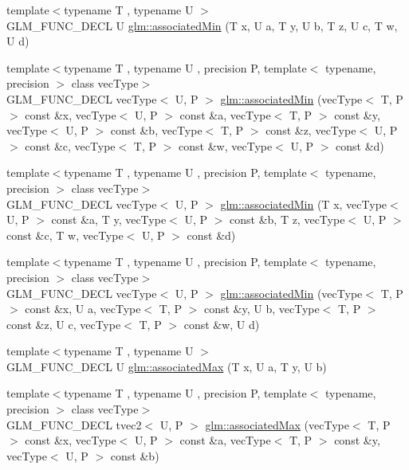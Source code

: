 \begin{DoxyCompactItemize}
\item 
{\footnotesize template$<$typename T , typename U $>$ }\\G\-L\-M\-\_\-\-F\-U\-N\-C\-\_\-\-D\-E\-C\-L U \hyperlink{group__gtx__associated__min__max_ga432224ebe2085eaa2b63a077ecbbbff6}{glm\-::associated\-Min} (T x, U a, T y, U b, T z, U c, T w, U d)
\item 
{\footnotesize template$<$typename T , typename U , precision P, template$<$ typename, precision $>$ class vec\-Type$>$ }\\G\-L\-M\-\_\-\-F\-U\-N\-C\-\_\-\-D\-E\-C\-L vec\-Type$<$ U, P $>$ \hyperlink{group__gtx__associated__min__max_ga88e031f22b80215505928900d3dde549}{glm\-::associated\-Min} (vec\-Type$<$ T, P $>$ const \&x, vec\-Type$<$ U, P $>$ const \&a, vec\-Type$<$ T, P $>$ const \&y, vec\-Type$<$ U, P $>$ const \&b, vec\-Type$<$ T, P $>$ const \&z, vec\-Type$<$ U, P $>$ const \&c, vec\-Type$<$ T, P $>$ const \&w, vec\-Type$<$ U, P $>$ const \&d)
\item 
{\footnotesize template$<$typename T , typename U , precision P, template$<$ typename, precision $>$ class vec\-Type$>$ }\\G\-L\-M\-\_\-\-F\-U\-N\-C\-\_\-\-D\-E\-C\-L vec\-Type$<$ U, P $>$ \hyperlink{group__gtx__associated__min__max_ga0f63b0dce5a5c3242cc6d9847e7d14f1}{glm\-::associated\-Min} (T x, vec\-Type$<$ U, P $>$ const \&a, T y, vec\-Type$<$ U, P $>$ const \&b, T z, vec\-Type$<$ U, P $>$ const \&c, T w, vec\-Type$<$ U, P $>$ const \&d)
\item 
{\footnotesize template$<$typename T , typename U , precision P, template$<$ typename, precision $>$ class vec\-Type$>$ }\\G\-L\-M\-\_\-\-F\-U\-N\-C\-\_\-\-D\-E\-C\-L vec\-Type$<$ U, P $>$ \hyperlink{group__gtx__associated__min__max_ga00a949fd345f4b31b259f033d3ab4a1c}{glm\-::associated\-Min} (vec\-Type$<$ T, P $>$ const \&x, U a, vec\-Type$<$ T, P $>$ const \&y, U b, vec\-Type$<$ T, P $>$ const \&z, U c, vec\-Type$<$ T, P $>$ const \&w, U d)
\item 
{\footnotesize template$<$typename T , typename U $>$ }\\G\-L\-M\-\_\-\-F\-U\-N\-C\-\_\-\-D\-E\-C\-L U \hyperlink{group__gtx__associated__min__max_ga7d9c8785230c8db60f72ec8975f1ba45}{glm\-::associated\-Max} (T x, U a, T y, U b)
\item 
{\footnotesize template$<$typename T , typename U , precision P, template$<$ typename, precision $>$ class vec\-Type$>$ }\\G\-L\-M\-\_\-\-F\-U\-N\-C\-\_\-\-D\-E\-C\-L tvec2$<$ U, P $>$ \hyperlink{group__gtx__associated__min__max_ga10ba6001798f42a0f941f19ff30e066a}{glm\-::associated\-Max} (vec\-Type$<$ T, P $>$ const \&x, vec\-Type$<$ U, P $>$ const \&a, vec\-Type$<$ T, P $>$ const \&y, vec\-Type$<$ U, P $>$ const \&b)

\end{DoxyCompactItemize}
